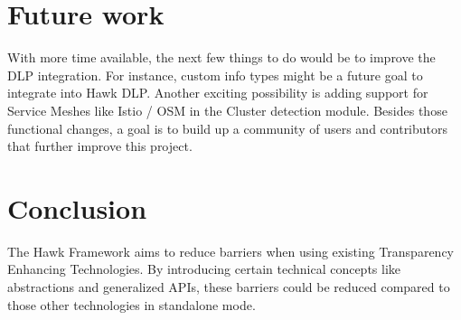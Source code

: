 


\graphicspath{{9/figures/}}

\section{Future work}
With more time available, the next few things to do would be to improve the DLP integration. For instance, custom info types might be a future goal to integrate into Hawk DLP. Another exciting possibility is adding support for Service Meshes like Istio / OSM in the Cluster detection module.
Besides those functional changes, a goal is to build up a community of users and contributors that further improve this project.

\section{Conclusion}
The Hawk Framework aims to reduce barriers when using existing Transparency Enhancing Technologies. By introducing certain technical concepts like abstractions and generalized APIs, these barriers could be reduced compared to those other technologies in standalone mode.

